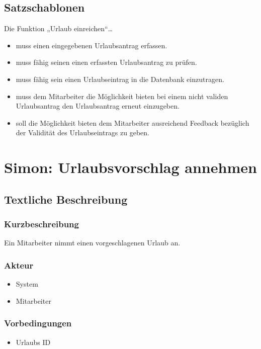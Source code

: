 \subsection{Satzschablonen}
Die Funktion „Urlaub einreichen“…
\begin{itemize}
\item muss einen eingegebenen Urlaubsantrag erfassen.
\item muss fähig seinen einen erfassten Urlaubsantrag zu prüfen.
\item muss fähig sein einen Urlaubseintrag in die Datenbank einzutragen.
\item muss dem Mitarbeiter die Möglichkeit bieten bei einem nicht validen Urlaubsantrag den Urlaubsantrag erneut einzugeben.
\item soll die Möglichkeit bieten dem Mitarbeiter ausreichend Feedback bezüglich der Validität des Urlaubseintrags zu geben.
\end{itemize}

\section{Simon: Urlaubsvorschlag annehmen}

\subsection{Textliche Beschreibung}

\subsubsection{Kurzbeschreibung}
Ein Mitarbeiter nimmt einen vorgeschlagenen Urlaub an.

\subsubsection{Akteur}
\begin{itemize}
	\item System
	\item Mitarbeiter
\end{itemize}

\subsubsection{Vorbedingungen}
\begin{itemize}
	\item Urlaubs ID
\end{itemize}

